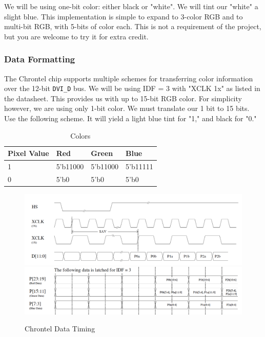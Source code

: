 \documentclass[11pt]{article}
\begin{document}
We will be using one-bit color: either black or "white". We will tint our "white" a slight blue. This implementation is simple to expand to 3-color RGB and to multi-bit RGB, with 5-bits of color each. This is not a requirement of the project, but you are welcome to try it for extra credit.

\subsubsection{Data Formatting}
The Chrontel chip supports multiple schemes for transferring color information over the 12-bit \verb|DVI_D| bus. We will be using IDF = 3 with "XCLK 1x" as listed in the datasheet. This provides us with up to 15-bit RGB color. For simplicity however, we are using only 1-bit color. We must translate our 1 bit to 15 bits. Use the following scheme. It will yield a light blue tint for "1," and black for "0."

\begin{table}[hbt]
	\begin{center}
		\caption{Colors}
		\label{colors}
		\begin{tabular}{l l l l}
			\toprule
			\textbf{Pixel Value} & \textbf{Red} & \textbf{Green} & \textbf{Blue} \\
			\midrule
			1 & 5'b11000 & 5'b11000 & 5'b11111 \\
			0 & 5'b0  & 5'b0 & 5'b0 \\
		\end{tabular}
	\end{center}
\end{table}

\begin{figure}[hbt]
\begin{center}
	\includegraphics[width=6.5in]{chrontel_data_timing}
	\includegraphics[width=6.5in]{idf3}
	\caption{Chrontel Data Timing}
	\label{fig:chrontel_data_timing}
\end{center}
\end{figure}
\end{document}
